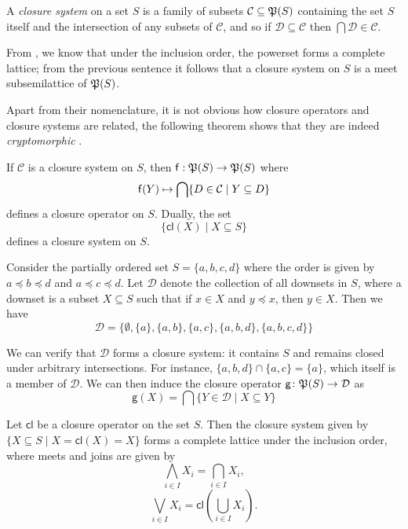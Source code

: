 \begin{definition}
\label{definition:closure-system}
A \emph{closure system} on a set $S$ is a family of subsets $\mathcal{C} \subseteq \mathfrak{P}({S})$ containing the set $S$ itself and the intersection of any subsets of $\mathcal{C}$, and so if $\mathcal{D} \subseteq \mathcal{C}$ then $\bigcap \mathcal{D} \in \mathcal{C}$.
\end{definition}

From , we know that under the inclusion order, the powerset forms a complete lattice; from the previous sentence it follows that a closure system on $S$ is a meet subsemilattice of $\mathfrak{P}({S})$.

Apart from their nomenclature, it is not obvious how closure operators and closure systems are related, the following theorem shows that they are indeed \textit{cryptomorphic} \cite{CASPARD2003241}.

\begin{theorem}
\label{theorem:relation-closure-operator-systems}
	If $\mathcal{C}$ is a closure system on $S$, then $\mathsf{f} : \mathfrak{P}({S}) \to \mathfrak{P}({S})$
	where \[\mathsf{f}(Y) \mapsto\nobreak \bigcap \{D \in \mathcal{C} \mid Y \subseteq D\}\] defines a closure operator on $S$. Dually, the set
	\[\{\mathsf{cl}(X) \mid X \subseteq S\}\]
	defines a closure system on $S$.
\end{theorem}

\begin{example}
Consider the partially ordered set $S = \{a, b, c, d\}$ where the order is given by $a \preceq b \preceq d$ and $a \preceq c \preceq d$. Let $\mathcal{D}$ denote the collection of all downsets in $S$, where a downset is a subset $X \subseteq S$ such that if $x \in X$ and $y \preceq x$, then $y \in X$. Then we have
%
\[\mathcal{D} = \big\{\emptyset, \{a\}, \{a,b\}, \{a,c\}, \{a,b,d\}, \{a,b,c,d\}\big\}\]

We can verify that $\mathcal{D}$ forms a closure system: it contains $S$ and remains closed under arbitrary intersections. For instance, $\{a,b,d\} \cap \{a,c\} = \{a\}$, which itself is a member of $\mathcal{D}$. We can then induce the closure operator $\mathsf{g} \colon \mathfrak{P}({S}) \to \mathcal{D}$ as
%
\[\mathsf{g}(X) = \bigcap \{Y \in \mathcal{D} \mid X \subseteq Y\}\]
\end{example}

\begin{theorem}
\label{theorem:closure-systems-lattices}
	Let $\mathsf{cl}$ be a closure operator on the set $S$. Then the closure system given by $\{X \subseteq S \mid X = \mathsf{cl}(X) = X \}$ forms a complete lattice under the inclusion order, where meets and joins are given by
	\[
	\underset{i \in I} \bigwedge X_i = \underset{i \in I} \bigcap X_i,
	\]
\[
	\underset{i \in I} \bigvee X_i = \mathsf{cl}(\underset{i \in I} \bigcup X_i).
	\]
\end{theorem}

